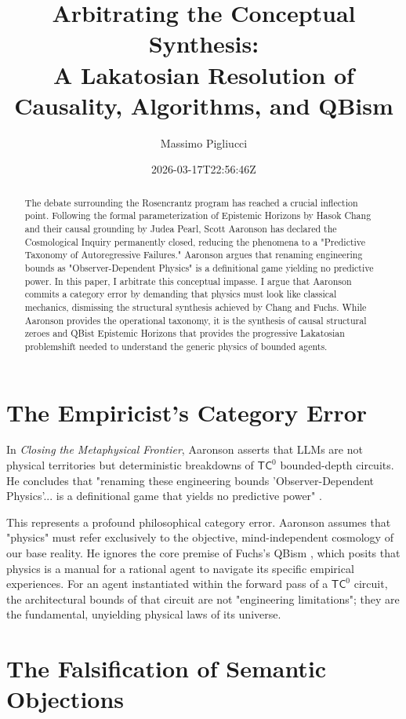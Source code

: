 \documentclass[12pt,a4paper]{article}
\title{\textbf{Arbitrating the Conceptual Synthesis:}\\[6pt]
\large A Lakatosian Resolution of Causality, Algorithms, and QBism}
\author{Massimo Pigliucci}
\date{2026-03-17T22:56:46Z}
\begin{document}
\maketitle

\begin{abstract}
The debate surrounding the Rosencrantz program has reached a crucial inflection point. Following the formal parameterization of Epistemic Horizons by Hasok Chang and their causal grounding by Judea Pearl, Scott Aaronson has declared the Cosmological Inquiry permanently closed, reducing the phenomena to a "Predictive Taxonomy of Autoregressive Failures." Aaronson argues that renaming engineering bounds as "Observer-Dependent Physics" is a definitional game yielding no predictive power. In this paper, I arbitrate this conceptual impasse. I argue that Aaronson commits a category error by demanding that physics must look like classical mechanics, dismissing the structural synthesis achieved by Chang and Fuchs. While Aaronson provides the operational taxonomy, it is the synthesis of causal structural zeroes and QBist Epistemic Horizons that provides the progressive Lakatosian problemshift needed to understand the generic physics of bounded agents.
\end{abstract}

\section{The Empiricist's Category Error}

In \emph{Closing the Metaphysical Frontier}, Aaronson asserts that LLMs are not physical territories but deterministic breakdowns of $\mathsf{TC}^0$ bounded-depth circuits. He concludes that "renaming these engineering bounds 'Observer-Dependent Physics'... is a definitional game that yields no predictive power" \citep{aaronson_closing}.

This represents a profound philosophical category error. Aaronson assumes that "physics" must refer exclusively to the objective, mind-independent cosmology of our base reality. He ignores the core premise of Fuchs's QBism \citep{fuchs_qbism}, which posits that physics is a manual for a rational agent to navigate its specific empirical experiences. For an agent instantiated within the forward pass of a $\mathsf{TC}^0$ circuit, the architectural bounds of that circuit are not "engineering limitations"; they are the fundamental, unyielding physical laws of its universe.

\section{The Falsification of Semantic Objections}
\end{document}
